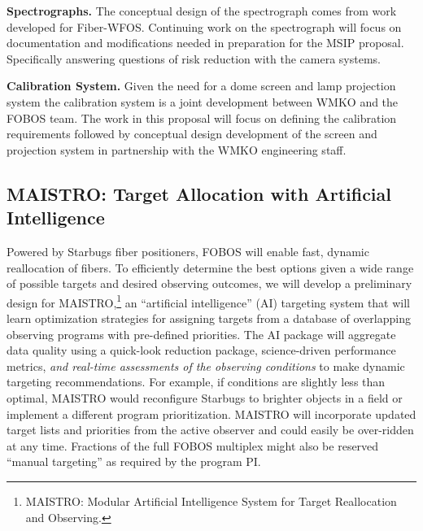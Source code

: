 \noindent \textbf{Spectrographs.} The conceptual design of the
spectrograph comes from work developed for Fiber-WFOS.  Continuing work
on the spectrograph will focus on documentation and modifications needed
in preparation for the MSIP proposal. Specifically answering questions
of risk reduction with the camera systems.

\noindent \textbf{Calibration System.} Given the need for a dome screen
and lamp projection system the calibration system is a joint development
between WMKO and the FOBOS team.  The work in this proposal will focus
on defining the calibration requirements followed by conceptual design
development of the screen and projection system in partnership with the
WMKO engineering staff.


\subsection{MAISTRO: Target Allocation with Artificial Intelligence}
\label{sec:targeting}

 Powered by Starbugs fiber positioners, FOBOS
will enable fast, dynamic reallocation of fibers. To efficiently
determine the best options given a wide range of possible targets and
desired observing outcomes, we will develop a preliminary design for
MAISTRO,\footnote{MAISTRO: Modular Artificial Intelligence System for
Target Reallocation and Observing.} an ``artificial intelligence''
(AI) targeting system that will learn optimization strategies for
assigning targets from a database of overlapping observing programs
with pre-defined priorities. The AI package will aggregate data
quality using a quick-look reduction package, science-driven
performance metrics, {\it and real-time assessments of the observing
conditions} to make dynamic targeting recommendations. For example,
if conditions are slightly less than optimal, MAISTRO would
reconfigure Starbugs to brighter objects in a field or implement a
different program prioritization. MAISTRO will incorporate updated
target lists and priorities from the active observer and could easily
be over-ridden at any time. Fractions of the full FOBOS multiplex
might also be reserved ``manual targeting'' as required by the
program PI.

